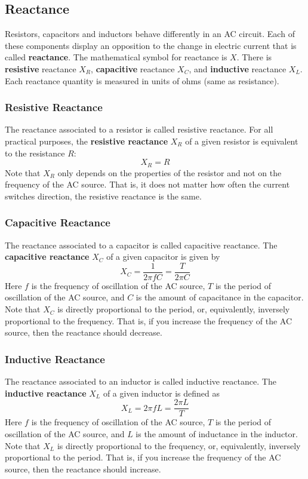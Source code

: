 \subsection{Reactance}
%
Resistors, capacitors and inductors behave differently in an AC circuit. Each of these components display an opposition to the change in electric current that is called \textbf{reactance}. The mathematical symbol for reactance is $X$. There is \textbf{resistive} reactance $X_{R}$, \textbf{capacitive} reactance $X_{C}$, and \textbf{inductive} reactance $X_{L}$. Each reactance quantity is measured in units of ohms (same as resistance).
%
\subsubsection{Resistive Reactance}
%
The reactance associated to a resistor is called resistive reactance. For all practical purposes, the \textbf{resistive reactance} $X_{R}$ of a given resistor is equivalent to the resistance $R$:
\begin{equation} \label{eq.06.reactance.R}
	X_{R} = R
\end{equation}
Note that $X_{R}$ only depends on the properties of the resistor and not on the frequency of the AC source. That is, it does not matter how often the current switches direction, the resistive reactance is the same.
%
\subsubsection{Capacitive Reactance}
%
The reactance associated to a capacitor is called capacitive reactance. The \textbf{capacitive reactance} $X_{C}$ of a given capacitor is given by
\begin{equation} \label{eq.06.reactance.C}
	X_{C} = \frac{1}{2 \pi f C} = \frac{T}{2 \pi C}
\end{equation}
Here $f$ is the frequency of oscillation of the AC source, $T$ is the period of oscillation of the AC source, and $C$ is the amount of capacitance in the capacitor. Note that $X_{C}$ is directly proportional to the period, or, equivalently, inversely proportional to the frequency. That is, if you increase the frequency of the AC source, then the reactance should decrease.
%
\subsubsection{Inductive Reactance}
%
The reactance associated to an inductor is called inductive reactance. The \textbf{inductive reactance} $X_{L}$ of a given inductor is defined as
\begin{equation} \label{eq.06.reactance.L}
	X_{L} = 2 \pi f L = \frac{2 \pi L}{T}
\end{equation}
Here $f$ is the frequency of oscillation of the AC source, $T$ is the period of oscillation of the AC source, and $L$ is the amount of inductance in the inductor. Note that $X_{L}$ is directly proportional to the frequency, or, equivalently, inversely proportional to the period. That is, if you increase the frequency of the AC source, then the reactance should increase.
%
